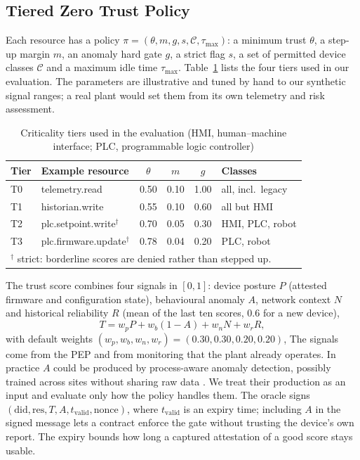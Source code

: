 \subsection{Tiered Zero Trust Policy}\label{sec:tiers}
Each resource has a policy $\pi=(\theta,m,g,s,\mathcal{C},\tau_{\max})$: a minimum trust $\theta$, a step-up margin $m$, an anomaly hard gate $g$, a strict flag $s$, a set of permitted device classes $\mathcal{C}$ and a maximum idle time $\tau_{\max}$. Table~\ref{tab:tiers} lists the four tiers used in our evaluation. The parameters are illustrative and tuned by hand to our synthetic signal ranges; a real plant would set them from its own telemetry and risk assessment.

\begin{table}[t]
\centering
\caption{Criticality tiers used in the evaluation (HMI, human--machine interface; PLC, programmable logic controller)}
\label{tab:tiers}
\scriptsize
\begin{tabular}{@{}llcccl@{}}
\toprule
\textbf{Tier} & \textbf{Example resource} & $\theta$ & $m$ & $g$ & \textbf{Classes} \\
\midrule
T0 & telemetry.read & 0.50 & 0.10 & 1.00 & all, incl.\ legacy \\
T1 & historian.write & 0.55 & 0.10 & 0.60 & all but HMI \\
T2 & plc.setpoint.write$^{\dagger}$ & 0.70 & 0.05 & 0.30 & HMI, PLC, robot \\
T3 & plc.firmware.update$^{\dagger}$ & 0.78 & 0.04 & 0.20 & PLC, robot \\
\bottomrule
\multicolumn{6}{l}{$^{\dagger}$ strict: borderline scores are denied rather than stepped up.}
\end{tabular}
\end{table}

The trust score combines four signals in $[0,1]$: device posture $P$ (attested firmware and configuration state), behavioural anomaly $A$, network context $N$ and historical reliability $R$ (mean of the last ten scores, 0.6 for a new device),
\begin{equation}
T=w_pP+w_b(1-A)+w_nN+w_rR,\label{eq:score}
\end{equation}
with default weights $(w_p,w_b,w_n,w_r)=(0.30,0.30,0.20,0.20)$,
\label{sec:signals}The signals come from the PEP and from monitoring that the plant already operates. In practice $A$ could be produced by process-aware anomaly detection, possibly trained across sites without sharing raw data \cite{tom2025flcti}. We treat their production as an input and evaluate only how the policy handles them. The oracle signs $(\mathrm{did},\mathrm{res},T,A,t_{\mathrm{valid}},\mathrm{nonce})$, where $t_{\mathrm{valid}}$ is an expiry time; including $A$ in the signed message lets a contract enforce the gate without trusting the device's own report. The expiry bounds how long a captured attestation of a good score stays usable.

